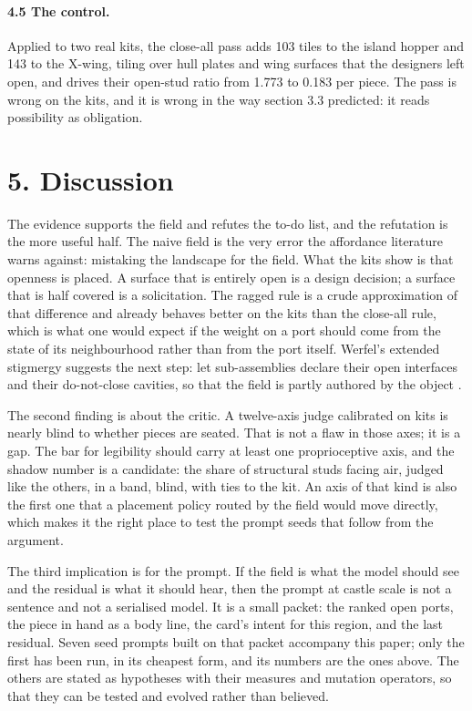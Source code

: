\documentclass[11pt,a4paper]{article}
\begin{document}
\paragraph{4.5 The control.} Applied to two real kits, the close-all pass adds 103 tiles to the island hopper and 143 to the X-wing, tiling over hull plates and wing surfaces that the designers left open, and drives their open-stud ratio from 1.773 to 0.183 per piece. The pass is wrong on the kits, and it is wrong in the way section 3.3 predicted: it reads possibility as obligation.

\section*{5. Discussion}
The evidence supports the field and refutes the to-do list, and the refutation is the more useful half. The naive field is the very error the affordance literature warns against: mistaking the landscape for the field. What the kits show is that openness is placed. A surface that is entirely open is a design decision; a surface that is half covered is a solicitation. The ragged rule is a crude approximation of that difference and already behaves better on the kits than the close-all rule, which is what one would expect if the weight on a port should come from the state of its neighbourhood rather than from the port itself. Werfel's extended stigmergy suggests the next step: let sub-assemblies declare their open interfaces and their do-not-close cavities, so that the field is partly authored by the object \cite{werfel2005stigmergy}.

The second finding is about the critic. A twelve-axis judge calibrated on kits is nearly blind to whether pieces are seated. That is not a flaw in those axes; it is a gap. The bar for legibility should carry at least one proprioceptive axis, and the shadow number is a candidate: the share of structural studs facing air, judged like the others, in a band, blind, with ties to the kit. An axis of that kind is also the first one that a placement policy routed by the field would move directly, which makes it the right place to test the prompt seeds that follow from the argument.

The third implication is for the prompt. If the field is what the model should see and the residual is what it should hear, then the prompt at castle scale is not a sentence and not a serialised model. It is a small packet: the ranked open ports, the piece in hand as a body line, the card's intent for this region, and the last residual. Seven seed prompts built on that packet accompany this paper; only the first has been run, in its cheapest form, and its numbers are the ones above. The others are stated as hypotheses with their measures and mutation operators, so that they can be tested and evolved rather than believed.
\end{document}
